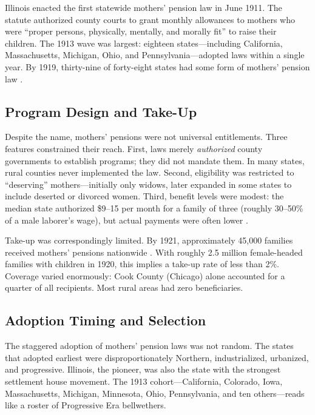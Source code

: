 \documentclass[12pt]{article}
\begin{document}
Illinois enacted the first statewide mothers' pension law in June 1911. The statute authorized county courts to grant monthly allowances to mothers who were ``proper persons, physically, mentally, and morally fit'' to raise their children. The 1913 wave was largest: eighteen states---including California, Massachusetts, Michigan, Ohio, and Pennsylvania---adopted laws within a single year. By 1919, thirty-nine of forty-eight states had some form of mothers' pension law \citep{thompson1919}.

\subsection{Program Design and Take-Up}

Despite the name, mothers' pensions were not universal entitlements. Three features constrained their reach. First, laws merely \emph{authorized} county governments to establish programs; they did not mandate them. In many states, rural counties never implemented the law. Second, eligibility was restricted to ``deserving'' mothers---initially only widows, later expanded in some states to include deserted or divorced women. Third, benefit levels were modest: the median state authorized \$9--15 per month for a family of three (roughly 30--50\% of a male laborer's wage), but actual payments were often lower \citep{moehling2007}.

Take-up was correspondingly limited. By 1921, approximately 45,000 families received mothers' pensions nationwide \citep{thompson1919}. With roughly 2.5 million female-headed families with children in 1920, this implies a take-up rate of less than 2\%. Coverage varied enormously: Cook County (Chicago) alone accounted for a quarter of all recipients. Most rural areas had zero beneficiaries.

\subsection{Adoption Timing and Selection}

The staggered adoption of mothers' pension laws was not random. The states that adopted earliest were disproportionately Northern, industrialized, urbanized, and progressive. Illinois, the pioneer, was also the state with the strongest settlement house movement. The 1913 cohort---California, Colorado, Iowa, Massachusetts, Michigan, Minnesota, Ohio, Pennsylvania, and ten others---reads like a roster of Progressive Era bellwethers.
\end{document}
